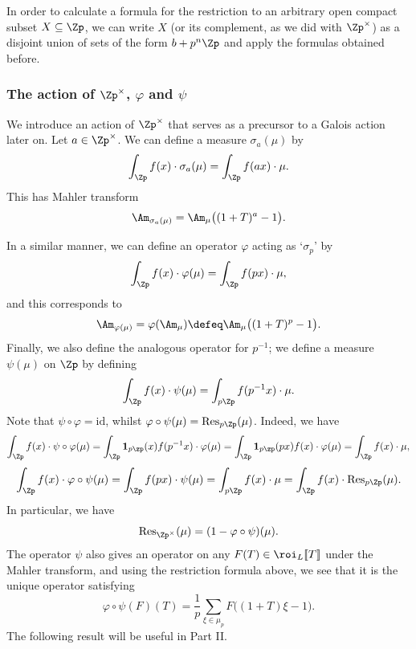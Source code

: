 \documentclass[a4paper,10pt, english, reqno]{smfart}
\newcommand{\lsem}{[\! [}
\newcommand{\rsem}{]\! ]}
\numberwithin{equation}{section}
\begin{document}
In order to calculate a formula for the restriction to an arbitrary open compact subset $X \subseteq \Zp$, we can write $X$ (or its complement, as we did with $\Zp^\times$) as a disjoint union of sets of the form $b + p^n \Zp$ and apply the formulas obtained before.



\subsubsection{The action of $\Zp^\times$, $\varphi$ and $\psi$} \label{SubSectionphipsi}

We introduce an action of $\Zp^\times$ that serves as a precursor to a Galois action later on. Let $a \in \Zp^\times$. We can define a measure $\sigma_a(\mu)$ by
\[\int_{\Zp}f(x)\cdot\sigma_a(\mu) = \int_{\Zp}f(ax)\cdot\mu.\]
This has Mahler transform
\[\Am_{\sigma_a(\mu)} = \Am_\mu\big((1+T)^a - 1\big).\] 
\vspace{0.1pt}

In a similar manner, we can define an operator $\varphi$ acting as `$\sigma_p$' by
\[\int_{\Zp}f(x)\cdot\varphi(\mu) = \int_{\Zp}f(px)\cdot\mu,\]
and this corresponds to 
\begin{equation}\label{eq:varphi power series}
\Am_{\varphi(\mu)} = \varphi(\Am_\mu) \defeq \Am_\mu\big((1+T)^p - 1\big).
\end{equation}
Finally, we also define the analogous operator for $p^{-1}$; we define a measure $\psi(\mu)$ on $\Zp$ by defining
\[\int_{\Zp}f(x)\cdot\psi(\mu) = \int_{p\Zp}f(p^{-1}x)\cdot\mu.\]
Note that $\psi\circ\varphi = \mathrm{id}$, whilst $\varphi\circ\psi(\mu) = \mathrm{Res}_{p\Zp}(\mu)$. Indeed, we have
\[ \int_{\Zp} f(x) \cdot \psi\circ\varphi(\mu) = \int_{\Zp} \mathbf{1}_{p \zp}(x) f(p^{-1}x) \cdot \varphi(\mu) = \int_{\Zp} \mathbf{1}_{p \zp}(px) f(x) \cdot \varphi(\mu) = \int_{\Zp} f(x) \cdot \mu,  \]
\[ \int_{\Zp} f(x) \cdot \varphi\circ\psi(\mu) = \int_{\Zp} f(px) \cdot \psi(\mu) = \int_{p \Zp} f(x) \cdot \mu = \int_{\Zp} f(x) \cdot \mathrm{Res}_{p\Zp}(\mu). \]
In particular, we have
\begin{equation}\label{res to Zp}\mathrm{Res}_{\Zp^\times}(\mu) = (1-\varphi\circ\psi)(\mu).
\end{equation}
The operator $\psi$ also gives an operator on any $F(T) \in \roi_L\lsem T\rsem $ under the Mahler transform, and using the restriction formula above, we see that it is the unique operator satisfying
\begin{equation} \label{Eqphipsi}
\varphi \circ \psi(F)(T) = \frac{1}{p}\sum_{\xi \in \mu_p}F\big((1+T)\xi - 1\big).
\end{equation}
The following result will be useful in Part II.
\end{document}
